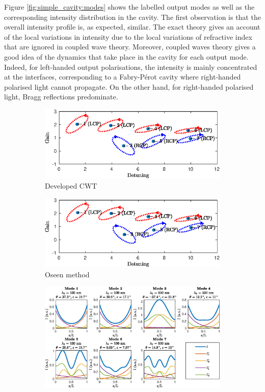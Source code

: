 Figure \ref{fig:simple_cavity:modes} shows the labelled output modes as well as the corresponding intensity distribution in the cavity. The first observation is that the overall intensity profile is, as expected, similar. The exact theory gives an account of the local variations in intensity due to the local variations of refractive index that are ignored in coupled wave theory. Moreover, coupled waves theory gives a good idea of the dynamics that take place in the cavity for each output mode. Indeed, for left-handed output polarisations, the intensity is mainly concentrated at the interfaces, corresponding to a Fabry-Pérot cavity where right-handed polarised light cannot propagate. On the other hand, for right-handed polarised light, Bragg reflections predominate.
\begin{figure}
	\centering
	\begin{subfigure}{.49\textwidth}
		\includegraphics[width=\textwidth]{plots/simple/modes_found}
		\caption{Developed CWT}
		\label{fig:simple_cavity:modes_found}
	\end{subfigure}
	\begin{subfigure}{.49\textwidth}
		\includegraphics[width=\textwidth]{plots/simple/modes_found_oseen}
		\caption{Oseen method}
		\label{fig:simple_cavity:modes_found_oseen}
	\end{subfigure}
	\begin{subfigure}{.49\textwidth}
		\includegraphics[width=\textwidth]{plots/simple/intensity_distribution}

\end{subfigure}
\end{figure}

